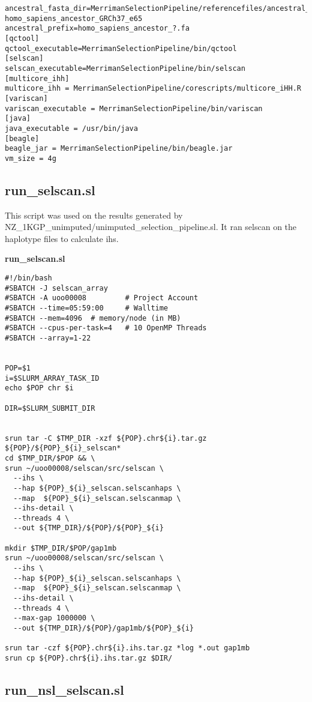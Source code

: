 \documentclass[]{report}
\begin{document}
\begin{appendices}
\begin{verbatim}
ancestral_fasta_dir=MerrimanSelectionPipeline/referencefiles/ancestral_ref/\
homo_sapiens_ancestor_GRCh37_e65
ancestral_prefix=homo_sapiens_ancestor_?.fa
[qctool]
qctool_executable=MerrimanSelectionPipeline/bin/qctool
[selscan]
selscan_executable=MerrimanSelectionPipeline/bin/selscan
[multicore_ihh]
multicore_ihh = MerrimanSelectionPipeline/corescripts/multicore_iHH.R
[variscan]
variscan_executable = MerrimanSelectionPipeline/bin/variscan
[java]
java_executable = /usr/bin/java
[beagle]
beagle_jar = MerrimanSelectionPipeline/bin/beagle.jar
vm_size = 4g
\end{verbatim}

\subsection{run\_selscan.sl}\label{run_selscan.sl}

This script was used on the results generated by
NZ\_1KGP\_unimputed/unimputed\_selection\_pipeline.sl. It ran selscan on
the haplotype files to calculate \gls{ihs}.

\textbf{run\_selscan.sl}

\begin{verbatim}
#!/bin/bash
#SBATCH -J selscan_array
#SBATCH -A uoo00008         # Project Account
#SBATCH --time=05:59:00     # Walltime
#SBATCH --mem=4096  # memory/node (in MB)
#SBATCH --cpus-per-task=4   # 10 OpenMP Threads
#SBATCH --array=1-22


POP=$1
i=$SLURM_ARRAY_TASK_ID
echo $POP chr $i

DIR=$SLURM_SUBMIT_DIR


srun tar -C $TMP_DIR -xzf ${POP}.chr${i}.tar.gz ${POP}/${POP}_${i}_selscan* 
cd $TMP_DIR/$POP && \
srun ~/uoo00008/selscan/src/selscan \
  --ihs \
  --hap ${POP}_${i}_selscan.selscanhaps \
  --map  ${POP}_${i}_selscan.selscanmap \
  --ihs-detail \
  --threads 4 \
  --out ${TMP_DIR}/${POP}/${POP}_${i}
  
mkdir $TMP_DIR/$POP/gap1mb
srun ~/uoo00008/selscan/src/selscan \
  --ihs \
  --hap ${POP}_${i}_selscan.selscanhaps \
  --map  ${POP}_${i}_selscan.selscanmap \
  --ihs-detail \
  --threads 4 \
  --max-gap 1000000 \
  --out ${TMP_DIR}/${POP}/gap1mb/${POP}_${i}

srun tar -czf ${POP}.chr${i}.ihs.tar.gz *log *.out gap1mb
srun cp ${POP}.chr${i}.ihs.tar.gz $DIR/
\end{verbatim}

\subsection{run\_nsl\_selscan.sl}\label{run_nsl_selscan.sl}


\end{appendices}
\end{document}
